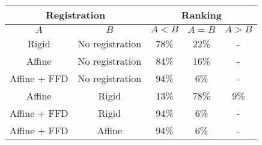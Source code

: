 \documentclass[11pt,a4paper,oneside]{report}
\begin{document}
 \begin{tabular}{ c | c | c | c | c }
 \hline
 \multicolumn{2}{c|}{Registration} &  \multicolumn{3}{|c}{Ranking}\\
 \hline
 $A$ & $B$ & $A < B$ & $A = B$ & $A > B$\\
  \hline
 Rigid & No registration & 78\% & 22\% & -\\
   \hline
 Affine & No registration & 84\% & 16\% & -\\
   \hline
 Affine + FFD & No registration & 94\% & 6\% & -\\
   \hline
 Affine & Rigid & 13\% & 78\% & 9\%\\
   \hline
 Affine + FFD & Rigid & 94\% & 6\% & -\\
   \hline
 Affine + FFD & Affine & 94\% & 6\% & -\\
   \hline
\end{tabular}




 
\end{document}
